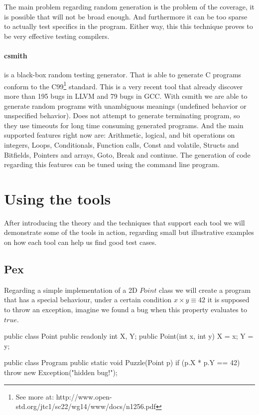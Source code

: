 \documentclass[citeauthoryear]{llncs}
\begin{document}
The main problem regarding random generation is the problem of the coverage, it is possible that will not be broad enough. And furthermore it can be
too sparse to actually test specifics in the program. Either way, this this technique proves to be very effective testing compilers.

\paragraph{\textbf{csmith}\cite{Yang:2011:FUB:1993316.1993532}} is a black-box random testing generator. That is able to generate C programs
conform to the C99\footnote{See more at: http://www.open-std.org/jtc1/sc22/wg14/www/docs/n1256.pdf} standard. This is a very recent tool that already discover
more than 195 bugs in LLVM and 79 bugs in GCC. With csmith we are able to generate random programs with unambiguous meanings (undefined behavior or 
unspecified behavior). Does not attempt to generate terminating program, so they use timeouts for long time consuming generated programs.
And the main supported features right now are: Arithmetic, logical, and bit operations on integers, Loops, Conditionals, Function calls, Const and volatile,
Structs and Bitfields, Pointers and arrays, Goto, Break and continue. The generation of code regarding this features can be tuned using the command line program.

\section{Using the tools}
After introducing the theory and the techniques that support each tool we will demonstrate some of the tools in action, regarding small but illustrative examples
on how each tool can help us find good test cases.

\subsection{Pex}
Regarding a simple implementation of a 2D $Point$ class we will create a program that has a special behaviour, under a certain condition
$x \times y \equiv 42$ it is supposed to throw an exception, imagine we found a bug when this property evaluates to $true$.

\begin{code}
public class Point  {
  public readonly int X, Y;
  public Point(int x, int y) { X = x; Y = y; }
}

public class Program {
  public static void Puzzle(Point p) {
    if (p.X * p.Y == 42)
        throw new Exception("hidden bug!");
	}
}
\end{code}
\end{document}
